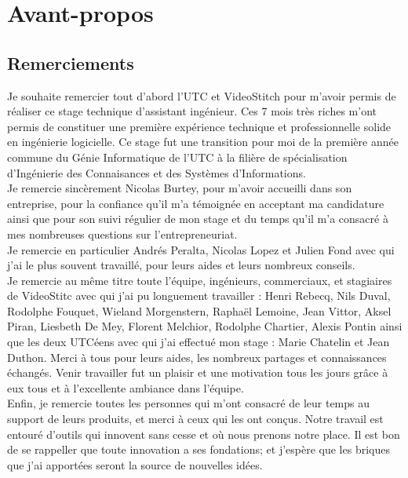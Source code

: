 \chapter*{Avant-propos}

\section*{Remerciements}
Je souhaite remercier tout d'abord l'UTC et VideoStitch pour m'avoir permis de 
réaliser ce stage technique d'assistant ingénieur. Ces 7 mois très riches m'ont 
permis de constituer une première expérience technique et professionnelle solide 
en ingénierie logicielle. Ce stage fut une transition pour moi de la première 
année commune du Génie Informatique de l'UTC à la filière de spécialisation 
d'Ingénierie des Connaisances et des Systèmes d'Informations.\\
\newline
Je remercie sincèrement Nicolas Burtey, pour m'avoir accueilli dans son entreprise,
pour la confiance qu'il m'a témoignée en acceptant ma candidature ainsi que pour
son suivi régulier de mon stage et du temps qu'il m'a consacré à mes nombreuses
questions sur l'entrepreneuriat.\\
Je remercie en particulier Andrés Peralta, Nicolas Lopez et Julien Fond avec qui 
j'ai le plus souvent travaillé, pour leurs aides et leurs nombreux conseils.\\
Je remercie au même titre toute l'équipe, ingénieurs, commerciaux, et stagiaires 
de VideoStitc avec qui j'ai pu longuement travailler :
Henri Rebecq, Nils Duval, Rodolphe Fouquet, Wieland Morgenstern, Raphaël 
Lemoine, Jean Vittor, Aksel Piran, Liesbeth De Mey, Florent Melchior, Rodolphe 
Chartier, Alexis Pontin ainsi que les deux UTCéens avec qui j'ai effectué mon 
stage : Marie Chatelin et Jean Duthon. Merci à tous pour leurs aides, 
les nombreux partages et connaissances échangés. Venir travailler fut un plaisir 
et une motivation tous les jours grâce à eux tous et à l'excellente ambiance dans l'équipe.\\
\newline
Enfin, je remercie toutes les personnes qui m'ont consacré de leur temps au support 
de leurs produits, et merci à ceux qui les ont conçus. Notre travail est entouré 
d'outils qui innovent sans cesse et où nous prenons notre place. Il est bon de 
se rappeller que toute innovation a ses fondations; et j'espère que les briques 
que j'ai apportées seront la source de nouvelles idées.

